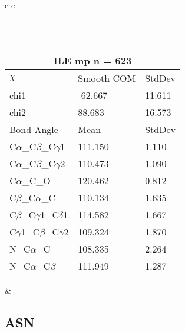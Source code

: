 \begin{longtable}{ c c }
\begin{tabular}{ l l l }
  \bottomrule
  \end{tabular}
  \\
  \begin{tabular}{ l l l }
  \toprule
  \multicolumn{3}{c}{ILE \textbf{mp} n = 623} \\ \toprule
  $\chi$       & Smooth COM & StdDev \\ \midrule
  chi1 & -62.667 & 11.611 \\ 
  chi2 & 88.683 & 16.573 \\ \midrule
  Bond Angle   & Mean     & StdDev \\ \midrule
  C$\alpha$\_C$\beta$\_C$\gamma$1 & 111.150 & 1.110\\
  C$\alpha$\_C$\beta$\_C$\gamma$2 & 110.473 & 1.090\\
  C$\alpha$\_C\_O & 120.462 & 0.812\\
  C$\beta$\_C$\alpha$\_C & 110.134 & 1.635\\
  C$\beta$\_C$\gamma$1\_C$\delta$1 & 114.582 & 1.667\\
  C$\gamma$1\_C$\beta$\_C$\gamma$2 & 109.324 & 1.870\\
  N\_C$\alpha$\_C & 108.335 & 2.264\\
  N\_C$\alpha$\_C$\beta$ & 111.949 & 1.287\\
  \bottomrule
  \end{tabular}
  &
  \\
  
\end{longtable}    

\newpage
\subsection{ASN}

